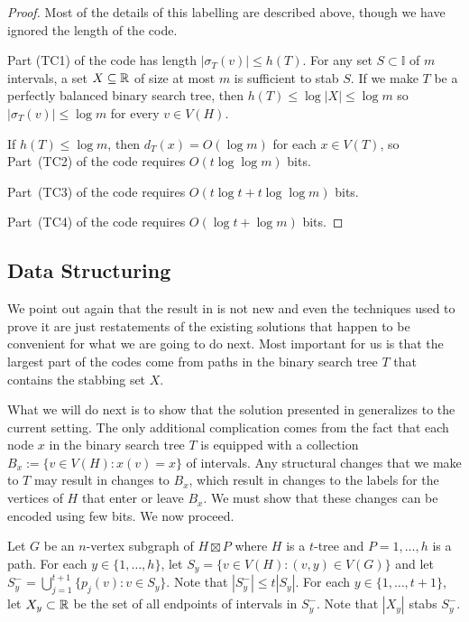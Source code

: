 \documentclass[kpfonts]{patmorin}
\newcommand{\snote}[1]{\fcolorbox{red}{yellow}{#1}}
\begin{document}
\begin{proof}
  Most of the details of this labelling are described above, though we have ignored the length of the code.
  
  Part (TC1) of the code has length $|\sigma_T(v)|\le h(T)$.  For any set $S\subset\mathbb{I}$ of $m$ intervals, a set $X\subseteq\mathbb{R}$ of size at most $m$ is sufficient to stab $S$.  If we make $T$ be a perfectly balanced binary search tree, then $h(T)\le\log|X|\le\log m$ so $|\sigma_T(v)|\le\log m$ for every $v\in V(H)$.
  
  If $h(T)\le\log m$, then $d_T(x)=O(\log m)$ for each $x\in V(T)$, so
  Part~(TC2) of the code requires $O(t\log\log m)$ bits.
  
  Part~(TC3) of the code requires $O(t\log t + t\log\log m)$ bits.
  
  Part~(TC4) of the code requires $O(\log t + \log m)$ bits.
\end{proof}


\subsection{Data Structuring}

We point out again that the result in  is not new and even the techniques used to prove it are just restatements of the existing solutions that happen to be convenient for what we are going to do next. Most important for us is that the largest part of the codes come from paths in the binary search tree $T$ that contains the stabbing set $X$.  

What we will do next is to show that the solution presented in  generalizes to the current setting.  The only additional complication comes from the fact that each node $x$ in the binary search tree $T$ is equipped with a collection $B_x:=\{v\in V(H):x(v)=x\}$ of intervals.  Any structural changes that we make to $T$ may result in changes to $B_x$, which result in changes to the labels for the vertices of $H$ that enter or leave $B_x$.  We must show that these changes can be encoded using few bits.  We now proceed.

Let $G$ be an $n$-vertex subgraph of $H\boxtimes P$ where $H$ is a $t$-tree and $P=1,\ldots,h$ is a path. For each $y\in\{1,\ldots,h\}$, let $S_y=\{v\in V(H): (v,y)\in V(G)\}$ \snote{Consistency: $S_y$ was $L_y$ in \secref{pxp}} and let $S^-_y=\bigcup_{j=1}^{t+1}\{p_j(v):v\in S_y\}$.  Note that $|S^-_y|\le t|S_y|$. For each $y\in\{1,\ldots,t+1\}$, let $X_y\subset\mathbb{R}$ be the set of all endpoints of intervals in $S^-_y$.  Note that $|X_y|$ stabs $S^-_y$.
\end{document}
